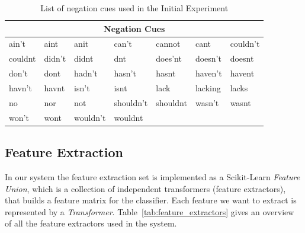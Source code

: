 \begin{table}[t]
    \centering
    \begin{tabular}{| l | l | l | l | l | l | l |}
        \hline
        \multicolumn{7}{|c|}{\textbf{Negation Cues}} \\ \hline
        ain't & aint & anit & can't & cannot & cant & couldn't \\ \hline
        couldnt & didn't & didnt & dnt & does'nt & doesn't & doesnt \\ \hline
        don't & dont & hadn't & hasn't & hasnt & haven't & havent \\ \hline
        havn't & havnt & isn't & isnt & lack & lacking & lacks \\ \hline
        no & nor & not & shouldn't & shouldnt & wasn't & wasnt\\ \hline
        won't & wont & wouldn't & wouldnt & \multicolumn{3}{c|}{} \\ \hline
    \end{tabular}
    \caption{List of negation cues used in the Initial Experiment}
    \label{tab:negation_cues}
\end{table}


\subsection{Feature Extraction}
\label{sec:feature_extraction}
In our system the feature extraction set is implemented as a Scikit-Learn \textit{Feature Union}, which is a collection of independent transformers (feature extractors), that builds a feature matrix for the classifier. Each feature we want to extract is represented by a \textit{Transformer}. Table~\ref{tab:feature_extractors} gives an overview of all the feature extractors used in the system.

